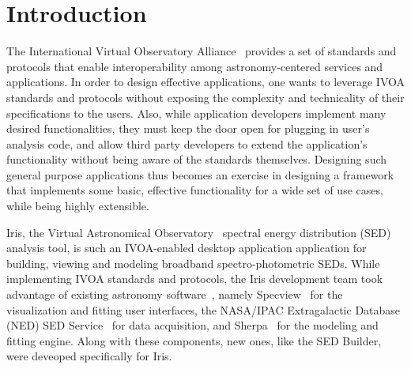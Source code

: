 \documentclass[final,5p]{elsarticle}
\begin{document}
\section{Introduction}
The International Virtual Observatory Alliance~\citep[IVOA;][]{2004SPIE.5493..137Q} provides a set of standards and protocols that enable interoperability among astronomy-centered services and applications. In order to design effective applications, one wants to leverage IVOA standards and protocols without exposing the complexity and technicality of their specifications to the users. Also, while application developers implement many desired functionalities, they must keep the door open for plugging in user's analysis code, and allow third party developers to extend the application's functionality without being aware of the standards themselves. Designing such general purpose applications thus becomes an exercise in designing a framework that implements some basic, effective functionality for a wide set of use cases, while being highly extensible.


Iris, the Virtual Astronomical Observatory~\citep[VAO;][]{2012SPIE.8449E..0HB} spectral energy distribution (SED) analysis tool, is such an IVOA-enabled desktop application application for building, viewing and modeling broadband spectro-photometric SEDs. While implementing IVOA standards and protocols, the Iris development team took advantage of existing astronomy software~\citep{2012ASPC..461..893D,2013AAS...22124038L}, namely Specview~\citep{2002SPIE.4847..410B} for the visualization and fitting user interfaces, the NASA/IPAC Extragalactic Database (NED) SED Service~\citep{2007ASPC..376..153M} for data acquisition, and Sherpa~\citep{2011ascl.soft07005F} for the modeling and fitting engine. Along with these components, new ones, like the SED Builder, were deveoped specifically for Iris.

\end{document}
